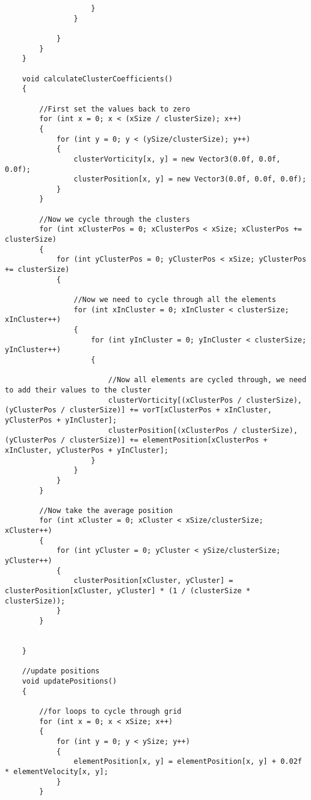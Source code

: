 \begin{mdframed}[linecolor=black, topline=true, bottomline=true,
  leftline=false, rightline=false]
\begin{verbatim}
                    }
                }

            }
        }
    }

    void calculateClusterCoefficients()
    {

        //First set the values back to zero
        for (int x = 0; x < (xSize / clusterSize); x++)
        {
            for (int y = 0; y < (ySize/clusterSize); y++)
            {
                clusterVorticity[x, y] = new Vector3(0.0f, 0.0f, 0.0f);
                clusterPosition[x, y] = new Vector3(0.0f, 0.0f, 0.0f);
            }
        }

        //Now we cycle through the clusters
        for (int xClusterPos = 0; xClusterPos < xSize; xClusterPos += clusterSize)
        {
            for (int yClusterPos = 0; yClusterPos < xSize; yClusterPos += clusterSize)
            {

                //Now we need to cycle through all the elements
                for (int xInCluster = 0; xInCluster < clusterSize; xInCluster++)
                {
                    for (int yInCluster = 0; yInCluster < clusterSize; yInCluster++)
                    {

                        //Now all elements are cycled through, we need to add their values to the cluster
                        clusterVorticity[(xClusterPos / clusterSize), (yClusterPos / clusterSize)] += vorT[xClusterPos + xInCluster, yClusterPos + yInCluster];
                        clusterPosition[(xClusterPos / clusterSize), (yClusterPos / clusterSize)] += elementPosition[xClusterPos + xInCluster, yClusterPos + yInCluster];
                    }
                }
            }
        }

        //Now take the average position
        for (int xCluster = 0; xCluster < xSize/clusterSize; xCluster++)
        {
            for (int yCluster = 0; yCluster < ySize/clusterSize; yCluster++)
            {
                clusterPosition[xCluster, yCluster] = clusterPosition[xCluster, yCluster] * (1 / (clusterSize * clusterSize));
            }
        }
    

    }

    //update positions
    void updatePositions()
    {

        //for loops to cycle through grid
        for (int x = 0; x < xSize; x++)
        {
            for (int y = 0; y < ySize; y++)
            {
                elementPosition[x, y] = elementPosition[x, y] + 0.02f * elementVelocity[x, y];
            }
        }


\end{verbatim}
\end{mdframed}
